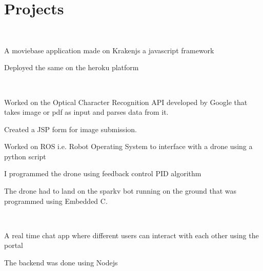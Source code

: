 \documentclass[]{resume-openfont}
\begin{document}
\begin{minipage}[t]{0.66\textwidth} 


\section{Projects}

\\
\vspace{\topsep} %
\begin{tightemize}\item A moviebase application made on Krakenjs a javascript framework\item Deployed the same on the heroku platform
\end{tightemize}
\sectionsep

\\
\begin{tightemize}
\item Worked on the Optical Character Recognition API developed by Google that takes image or pdf as input and parses data from it.\item Created a JSP form for image submission.\end{tightemize}
\sectionsep

\begin{tightemize}
\item Worked on ROS i.e. Robot Operating System to interface with a drone using a python script \item I programmed the drone using feedback control PID algorithm\item The drone had to land on the sparkv bot running on the ground that was programmed using Embedded C.\end{tightemize}
\sectionsep

\\
\begin{tightemize}
\item A real time chat app where different users can interact with each other using the portal\item The backend was done using Nodejs\end{tightemize}
\sectionsep


\end{minipage}
\end{document}

